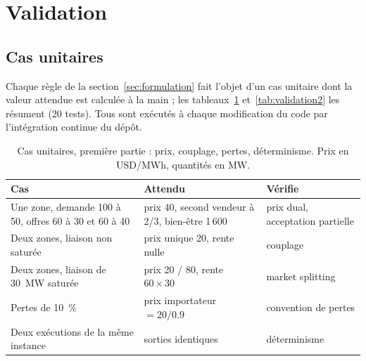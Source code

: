 \documentclass[a4paper,12pt]{article}
\newcommand{\rowsep}{\addlinespace[2pt]\arrayrulecolor{black!35}\hline\arrayrulecolor{black}\addlinespace[3pt]}
\renewcommand{\arraystretch}{1.25}
\theoremstyle{definition}
\begin{document}
\section{Validation}\label{sec:validation}

\subsection{Cas unitaires}

Chaque règle de la section~\ref{sec:formulation} fait l'objet d'un cas unitaire dont la valeur attendue est calculée à la main ; les tableaux~\ref{tab:validation} et~\ref{tab:validation2} les résument (20 tests). Tous sont exécutés à chaque modification du code par l'intégration continue du dépôt.

\begin{table}[H]
\centering\small
\setlength{\tabcolsep}{6pt}\renewcommand{\arraystretch}{1.25}\begin{tabular}{p{5.2cm}p{6.0cm}p{3.4cm}}
\toprule
Cas & Attendu & Vérifie \\
\midrule
Une zone, demande 100 à 50, offres 60 à 30 et 60 à 40 & prix 40, second vendeur à 2/3, bien-être 1\,600 & prix dual, acceptation partielle \\ \rowsep
Deux zones, liaison non saturée & prix unique 20, rente nulle & couplage \\ \rowsep
Deux zones, liaison de 30~MW saturée & prix 20 / 80, rente $60\times30$ & market splitting \\ \rowsep
Pertes de 10~\% & prix importateur $=20/0.9$ & convention de pertes \\ \rowsep
Deux exécutions de la même instance & sorties identiques & déterminisme \\
\bottomrule
\end{tabular}
\caption{Cas unitaires, première partie : prix, couplage, pertes, déterminisme. Prix en USD/MWh, quantités en MW.}
\label{tab:validation}
\end{table}
\end{document}

